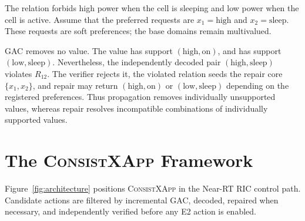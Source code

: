 \documentclass[pdflatex,sn-mathphys-num,iicol,oneside]{sn-jnl}
\newcommand{\method}{\textsc{ConsistXApp}\xspace}
\newcommand{\gac}{\textsc{GAC}\xspace}
\begin{document}
The relation forbids high power when the cell is sleeping and low
power when the cell is active. Assume that the preferred requests are
$x_1=\text{high}$ and $x_2=\text{sleep}$. These requests are soft
preferences; the base domains remain multivalued.

\gac removes no value. The value  has support
$(\text{high},\text{on})$, and  has support
$(\text{low},\text{sleep})$. Nevertheless, the independently decoded
pair
$(\text{high},\text{sleep})$ violates $R_{12}$. The verifier rejects
it, the violated relation seeds the repair core
$\{x_1,x_2\}$, and repair may return
$(\text{high},\text{on})$ or $(\text{low},\text{sleep})$ depending on
the registered preferences. Thus propagation removes individually
unsupported values, whereas repair resolves incompatible
combinations of individually supported values.

\section{The \method Framework}
\label{sec:method}

Figure~\ref{fig:architecture} positions \method in the Near-RT RIC
control path. Candidate actions are filtered by incremental \gac,
decoded, repaired when necessary, and independently verified before
any E2 action is enabled.
\end{document}
